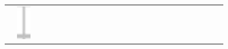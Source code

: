 \documentclass[10pt]{article}
\begin{document}
\begin{center}
\begin{tabular}{|c|c|c|c|c|c|c|c|c|c|c|c|c|c|c|c|c|c|c|c|c|c|c|c|c|}
 & \includegraphics[max width=\textwidth]{2024_11_21_ba65d61981011633d840g-09}

\end{tabular}
\end{center}
\end{document}
